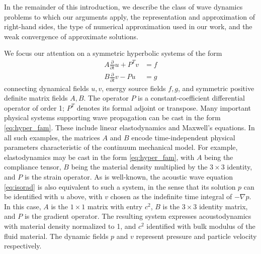 In the remainder of this introduction, we describe the class of wave
dynamics problems to which our arguments apply, the representation and approximation
of right-hand sides,  the type of numerical
approximation used in our work, and the weak convergence of approximate solutions.

We focus our attention on a symmetric hyperbolic systems of the form
\begin{equation}\label{eq:hyper_fam}
\begin{split}
	A \frac{\partial}{\partial t}u + P^T v &= f \\
	B \frac{\partial}{\partial t}v  - P u & = g
\end{split}
\end{equation}
connecting dynamical fields $u,v$, energy source fields $f,g$, and symmetric
positive definite matrix fields $A,B$. The operator $P$ is a
constant-coefficient differential operator of order 1; $P^T$ denotes its
formal adjoint or transpose.
Many important physical systems supporting wave propagation can be
cast in the form \ref{eq:hyper_fam}. These include linear
elastodynamics and Maxwell's equations. In all such examples, the
matrices $A$ and $B$ encode time-independent physical parameters characteristic of the
continuum mechanical model. For example, elastodynamics may be cast in
the form \ref{eq:hyper_fam}, with $A$ being the compliance tensor,
$B$ being the material density multiplied by the $3 \times 3$
identity, and $P$ is the strain operator. As is well-known, the acoustic
wave equation \ref{eq:isorad} is also equivalent to such a system, in the
sense that its solution $p$ can be identified with $u$ above, with $v$
chosen as the indefinite time integral of $-\nabla p$. In this case,
$A$ is the $1 \times 1$ matrix with entry $c^2$, $B$ is the $3
\times 3$ identity matrix, and $P$ is the gradient operator. The resulting system expresses
acoustodynamics with material density normalized to 1, and $c^2$
identified with bulk modulus of the fluid material. The dynamic fields
$p$ and $v$ represent pressure and particle velocity respectively.

